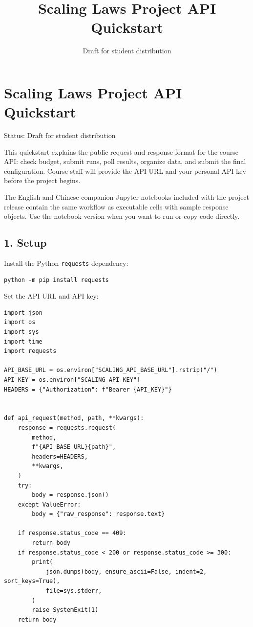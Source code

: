 \documentclass[
]{article}
\title{Scaling Laws Project API Quickstart}
\author{}
\date{Draft for student distribution}
\newcommand{\passthrough}[1]{#1}
\begin{document}
\maketitle

{
\hypersetup{linkcolor=}
\setcounter{tocdepth}{3}
\tableofcontents
}
\hypertarget{scaling-laws-project-api-quickstart}{%
\section{Scaling Laws Project API
Quickstart}\label{scaling-laws-project-api-quickstart}}

Status: Draft for student distribution

This quickstart explains the public request and response format for the
course API: check budget, submit runs, poll results, organize data, and
submit the final configuration. Course staff will provide the API URL
and your personal API key before the project begins.

The English and Chinese companion Jupyter notebooks included with the
project release contain the same workflow as executable cells with
sample response objects. Use the notebook version when you want to run
or copy code directly.

\hypertarget{setup}{%
\subsection{1. Setup}\label{setup}}

Install the Python \passthrough{\lstinline!requests!} dependency:

\begin{verbatim}
python -m pip install requests
\end{verbatim}

Set the API URL and API key:

\begin{verbatim}
import json
import os
import sys
import time
import requests

API_BASE_URL = os.environ["SCALING_API_BASE_URL"].rstrip("/")
API_KEY = os.environ["SCALING_API_KEY"]
HEADERS = {"Authorization": f"Bearer {API_KEY}"}


def api_request(method, path, **kwargs):
    response = requests.request(
        method,
        f"{API_BASE_URL}{path}",
        headers=HEADERS,
        **kwargs,
    )
    try:
        body = response.json()
    except ValueError:
        body = {"raw_response": response.text}

    if response.status_code == 409:
        return body
    if response.status_code < 200 or response.status_code >= 300:
        print(
            json.dumps(body, ensure_ascii=False, indent=2, sort_keys=True),
            file=sys.stderr,
        )
        raise SystemExit(1)
    return body
\end{verbatim}
\end{document}
